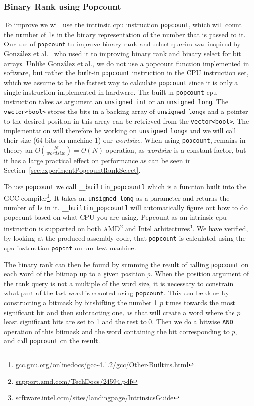 \subsubsection{Binary Rank using Popcount}
\label{sec:popcountBinaryRank}
To improve  we will use the intrinsic cpu instruction \texttt{popcount}, which will count the number of 1s in the binary representation of the number that is passed to it.
Our use of \texttt{popcount} to improve binary rank and select queries was inspired by~ González et al.~ who used it to improving binary rank and binary select for bit arrays.
Unlike González et al., we do not use a popcount function implemented in software, but rather the built-in \texttt{popcount} instruction in the CPU instruction set, which we assume to be the fastest way to calculate \texttt{popcount} since it is only a single instruction implemented in hardware.
The built-in \texttt{popcount} cpu instruction takes as argument an \texttt{unsigned int} or an \texttt{unsigned long}.
The \texttt{vector<bool>} stores the bits in a backing array of \texttt{unsigned long}s and a pointer to the desired position in this array can be retrieved from the \texttt{vector<bool>}.
The implementation will therefore be working on \texttt{unsigned long}s and we will call their size (64 bits on machine 1) our \textit{wordsize}.
When using \texttt{popcount},  remains in theory an $O(\frac{N}{\mathit{wordsize}}) = O(N)$ operation, as \textit{wordsize} is a constant factor, but it has a large practical effect on performance as can be seen in Section~\ref{sec:experimentPopcountRankSelect}.

To use \texttt{popcount} we call \texttt{\_\_builtin\_popcountl} which is a function built into the GCC compiler\footnote{\url{gcc.gnu.org/onlinedocs/gcc-4.1.2/gcc/Other-Builtins.html}}. 
It takes an \texttt{unsigned long} as a parameter and returns the number of 1s in it. \texttt{\_\_builtin\_popcountl} will automatically figure out how to do popcount based on what CPU you are using. Popcount as an intrinsic cpu instruction is supported on both AMD\footnote{\url{support.amd.com/TechDocs/24594.pdf}} and Intel arhitectures\footnote{\url{software.intel.com/sites/landingpage/IntrinsicsGuide}}.
We have verified, by looking at the produced assembly code, that \texttt{popcount} is calculated using the cpu instruction \texttt{popcnt} on our test machine.
	
The binary rank can then be found by summing the result of calling \texttt{popcount} on each word of the bitmap up to a given position $p$.
When the position argument of the rank query is not a multiple of the word size, it is necessary to constrain what part of the last word is counted using \texttt{popcount}. This can be done by constructing a bitmask by bitshifting the number 1 $p$ times towards the most significant bit and then subtracting one, as that will create a word where the $p$ least significant bits are set to 1 and the rest to 0.
Then we do a bitwise \texttt{AND} operation of this bitmask and the word containing the bit corresponding to $p$, and call \texttt{popcount} on the result. 

